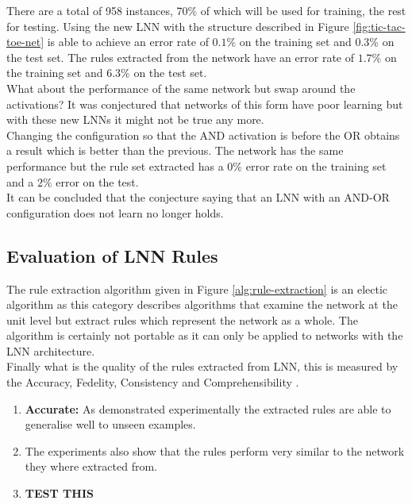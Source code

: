 There are a total of 958 instances, 70\% of which will be used for training, the rest for testing. Using the new LNN with the structure described in Figure \ref{fig:tic-tac-toe-net} is able to achieve an error rate of $0.1\%$ on the training set and $0.3\%$ on the test set. The rules extracted from the network have an error rate of $1.7\%$ on the training set and $6.3\%$ on the test set.\\

What about the performance of the same network but swap around the activations? It was conjectured that networks of this form have poor learning \cite{LearningLogicalActivations} but with these new LNNs it might not be true any more.\\

Changing the configuration so that the AND activation is before the OR obtains a result which is better than the previous. The network has the same performance but the rule set extracted has a $0\%$ error rate on the training set and a $2\%$ error on the test.\\

It can be concluded that the conjecture saying that an LNN with an AND-OR configuration does not learn no longer holds.

\subsection{Evaluation of LNN Rules}
The rule extraction algorithm given in Figure \ref{alg:rule-extraction} is an electic algorithm as this category describes algorithms that examine the network at the unit level but extract rules which represent the network as a whole. The algorithm is certainly not portable as it can only be applied to networks with the LNN architecture.\\

Finally what is the quality of the rules extracted from LNN, this is measured by the Accuracy, Fedelity, Consistency and Comprehensibility \cite{andrews1995survey}.

\begin{enumerate}
	\item \textbf{Accurate:} As demonstrated experimentally the extracted rules are able to generalise well to unseen examples.
	\item {} The experiments also show that the rules perform very similar to the network they where extracted from.
	\item {} \textbf{TEST THIS}
\end{enumerate}

